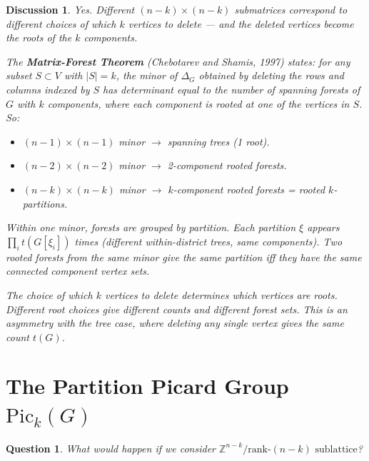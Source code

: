 \documentclass[11pt]{article}
\newcommand{\Z}{\mathbb{Z}}
\newtheorem{question}{Question}
\newtheorem{answer}{Discussion}
\begin{document}
\begin{answer}
Yes. Different $(n-k) \times (n-k)$ submatrices correspond to different
choices of which $k$ vertices to delete --- and the deleted vertices become the
roots of the $k$ components.

The \textbf{Matrix-Forest Theorem} (Chebotarev and Shamis, 1997) states: for
any subset $S \subset V$ with $|S| = k$, the minor of $\Delta_G$ obtained by
deleting the rows and columns indexed by $S$ has determinant equal to the
number of spanning forests of $G$ with $k$ components, where each component is
rooted at one of the vertices in $S$. So:
\begin{itemize}
  \item $(n-1) \times (n-1)$ minor $\to$ spanning trees (1 root).
  \item $(n-2) \times (n-2)$ minor $\to$ 2-component rooted forests.
  \item $(n-k) \times (n-k)$ minor $\to$ $k$-component rooted forests =
    rooted $k$-partitions.
\end{itemize}

Within one minor, forests are grouped by partition. Each partition $\xi$
appears $\prod_i t(G[\xi_i])$ times (different within-district trees, same
components). Two rooted forests from the same minor give the same partition iff
they have the same connected component vertex sets.

The choice of which $k$ vertices to delete determines which vertices are
roots. Different root choices give different counts and different forest sets.
This is an asymmetry with the tree case, where deleting any single vertex gives
the same count $t(G)$.
\end{answer}


\section{The Partition Picard Group $\mathrm{Pic}_k(G)$}

\begin{question}
What would happen if we consider $\Z^{n-k} / \text{rank-$(n-k)$ sublattice}$?
\end{question}
\end{document}
